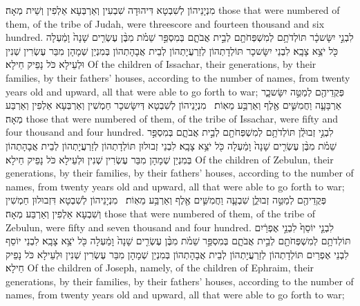 {מִנְיָנֵיהוֹן לְשִׁבְטָא דִּיהוּדָה שִׁבְעִין וְאַרְבְּעָא אַלְפִין וְשֵׁית מְאָה׃}
{those that were numbered of them, of the tribe of Judah, were threescore and fourteen thousand and six hundred.}{}
{לִבְנֵ֣י יִשָּׂשכָ֔ר תּוֹלְדֹתָ֥ם לְמִשְׁפְּחֹתָ֖ם לְבֵ֣ית אֲבֹתָ֑ם בְּמִסְפַּ֣ר שֵׁמֹ֗ת מִבֶּ֨ן עֶשְׂרִ֤ים שָׁנָה֙ וָמַ֔עְלָה כֹּ֖ל יֹצֵ֥א צָבָֽא׃}
{לִבְנֵי יִשָּׂשכָר תּוֹלְדָתְהוֹן לְזַרְעֲיָתְהוֹן לְבֵית אֲבָהָתְהוֹן בְּמִנְיַן שְׁמָהָן מִבַּר עֶשְׂרִין שְׁנִין וּלְעֵילָא כֹּל נָפֵיק חֵילָא׃}
{Of the children of Issachar, their generations, by their families, by their fathers’ houses, according to the number of names, from twenty years old and upward, all that were able to go forth to war;}{}
{פְּקֻדֵיהֶ֖ם לְמַטֵּ֣ה יִשָּׂשכָ֑ר אַרְבָּעָ֧ה וַחֲמִשִּׁ֛ים אֶ֖לֶף וְאַרְבַּ֥ע מֵאֽוֹת׃ \petucha }
{מִנְיָנֵיהוֹן לְשִׁבְטָא דְּיִשָּׂשכָר חַמְשִׁין וְאַרְבְּעָא אַלְפִין וְאַרְבַּע מְאָה׃}
{those that were numbered of them, of the tribe of Issachar, were fifty and four thousand and four hundred.}{}
{לִבְנֵ֣י זְבוּלֻ֔ן תּוֹלְדֹתָ֥ם לְמִשְׁפְּחֹתָ֖ם לְבֵ֣ית אֲבֹתָ֑ם בְּמִסְפַּ֣ר שֵׁמֹ֗ת מִבֶּ֨ן עֶשְׂרִ֤ים שָׁנָה֙ וָמַ֔עְלָה כֹּ֖ל יֹצֵ֥א צָבָֽא׃}
{לִבְנֵי זְבוּלוּן תּוֹלְדָתְהוֹן לְזַרְעֲיָתְהוֹן לְבֵית אֲבָהָתְהוֹן בְּמִנְיַן שְׁמָהָן מִבַּר עֶשְׂרִין שְׁנִין וּלְעֵילָא כֹּל נָפֵיק חֵילָא׃}
{Of the children of Zebulun, their generations, by their families, by their fathers’ houses, according to the number of names, from twenty years old and upward, all that were able to go forth to war;}{}
{פְּקֻדֵיהֶ֖ם לְמַטֵּ֣ה זְבוּלֻ֑ן שִׁבְעָ֧ה וַחֲמִשִּׁ֛ים אֶ֖לֶף וְאַרְבַּ֥ע מֵאֽוֹת׃ \petucha }
{מִנְיָנֵיהוֹן לְשִׁבְטָא דִּזְבוּלוּן חַמְשִׁין וְשִׁבְעָא אַלְפִין וְאַרְבַּע מְאָה׃}
{those that were numbered of them, of the tribe of Zebulun, were fifty and seven thousand and four hundred.}{}
{לִבְנֵ֤י יוֹסֵף֙ לִבְנֵ֣י אֶפְרַ֔יִם תּוֹלְדֹתָ֥ם לְמִשְׁפְּחֹתָ֖ם לְבֵ֣ית אֲבֹתָ֑ם בְּמִסְפַּ֣ר שֵׁמֹ֗ת מִבֶּ֨ן עֶשְׂרִ֤ים שָׁנָה֙ וָמַ֔עְלָה כֹּ֖ל יֹצֵ֥א צָבָֽא׃}
{לִבְנֵי יוֹסֵף לִבְנֵי אֶפְרַיִם תּוֹלְדָתְהוֹן לְזַרְעֲיָתְהוֹן לְבֵית אֲבָהָתְהוֹן בְּמִנְיַן שְׁמָהָן מִבַּר עֶשְׂרִין שְׁנִין וּלְעֵילָא כֹּל נָפֵיק חֵילָא׃}
{Of the children of Joseph, namely, of the children of Ephraim, their generations, by their families, by their fathers’ houses, according to the number of names, from twenty years old and upward, all that were able to go forth to war;}{}
